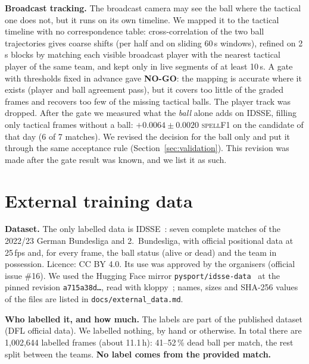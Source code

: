 \documentclass[journal]{IEEEtran}
\newcommand{\spf}{\textsc{spellF1}}
\begin{document}
\textbf{Broadcast tracking.} The broadcast camera may see the ball where the tactical one does not, but it runs on its own timeline. We mapped it to the tactical timeline with no correspondence table: cross-correlation of the two ball trajectories gives coarse shifts (per half and on sliding 60\,s windows), refined on 2\,s blocks by matching each visible broadcast player with the nearest tactical player of the same team, and kept only in live segments of at least 10\,s. A gate with thresholds fixed in advance gave \textbf{NO-GO}: the mapping is accurate where it exists (player and ball agreement pass), but it covers too little of the graded frames and recovers too few of the missing tactical balls. The player track was dropped. After the gate we measured what the \emph{ball} alone adds on IDSSE, filling only tactical frames without a ball: $+0.0064\pm0.0020$ \spf{} on the candidate of that day (6 of 7 matches). We revised the decision for the ball only and put it through the same acceptance rule (Section~\ref{sec:validation}). This revision was made after the gate result was known, and we list it as such.

\section{External training data}
\label{sec:external}

\textbf{Dataset.} The only labelled data is IDSSE~\cite{bassek2025}: seven complete matches of the 2022/23 German Bundesliga and 2.~Bundesliga, with official positional data at 25\,fps and, for every frame, the ball status (alive or dead) and the team in possession. Licence: CC BY 4.0. Its use was approved by the organisers (official issue \#16). We used the Hugging Face mirror \texttt{pysport/idsse-data}~\cite{idssehf} at the pinned revision \texttt{a715a38d\ldots}, read with kloppy~\cite{kloppy}; names, sizes and SHA-256 values of the files are listed in \texttt{docs/external\_data.md}.

\textbf{Who labelled it, and how much.} The labels are part of the published dataset (DFL official data). We labelled nothing, by hand or otherwise. In total there are 1{,}002{,}644 labelled frames (about 11.1\,h): 41--52\,\% dead ball per match, the rest split between the teams. \textbf{No label comes from the provided match.}
\end{document}
